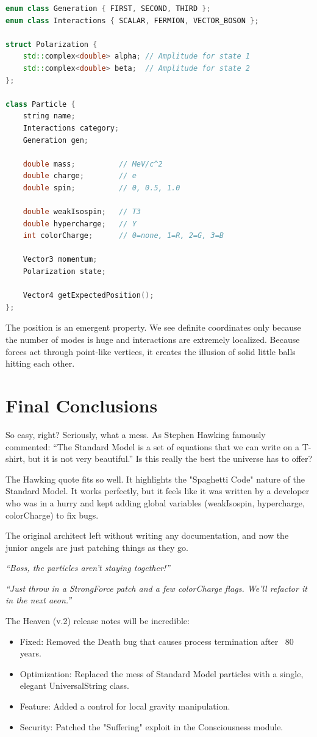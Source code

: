 \begin{lstlisting}[language=C++, caption=The Standard Model Particle Class (Production)]
enum class Generation { FIRST, SECOND, THIRD };
enum class Interactions { SCALAR, FERMION, VECTOR_BOSON };

struct Polarization {
    std::complex<double> alpha; // Amplitude for state 1
    std::complex<double> beta;  // Amplitude for state 2
};

class Particle {
    string name;
    Interactions category;
    Generation gen;

    double mass;          // MeV/c^2
    double charge;        // e
    double spin;          // 0, 0.5, 1.0
    
    double weakIsospin;   // T3
    double hypercharge;   // Y
    int colorCharge;      // 0=none, 1=R, 2=G, 3=B
    
    Vector3 momentum;
    Polarization state;

    Vector4 getExpectedPosition();
};
\end{lstlisting}

The position is an emergent property. We see definite coordinates only because the number of modes is huge and interactions are extremely localized. Because forces act through point-like vertices, it creates the illusion of solid little balls hitting each other.

\section{Final Conclusions}

So easy, right? Seriously, what a mess. 
As Stephen Hawking famously commented: ``The Standard Model is a set of equations that we can write on a T-shirt, but it is not very beautiful.'' Is this really the best the universe has to offer?

The Hawking quote fits so well. It highlights the "Spaghetti Code" nature of the Standard Model.
It works perfectly, but it feels like it was written by a developer who was in a hurry and kept adding global variables (weakIsospin, hypercharge, colorCharge) to fix bugs.

The original architect left without writing any documentation, and now the junior angels are just patching things as they go.

\textit{``Boss, the particles aren't staying together!''}

\textit{``Just throw in a StrongForce patch and a few colorCharge flags. We’ll refactor it in the next aeon.''}

The Heaven (v.2) release notes will be incredible:

\begin{itemize}
\item Fixed: Removed the Death bug that causes process termination after ~80 years.
\item Optimization: Replaced the mess of Standard Model particles with a single, elegant UniversalString class.
\item Feature: Added a control for local gravity manipulation.
\item Security: Patched the "Suffering" exploit in the Consciousness module.
\end{itemize}
